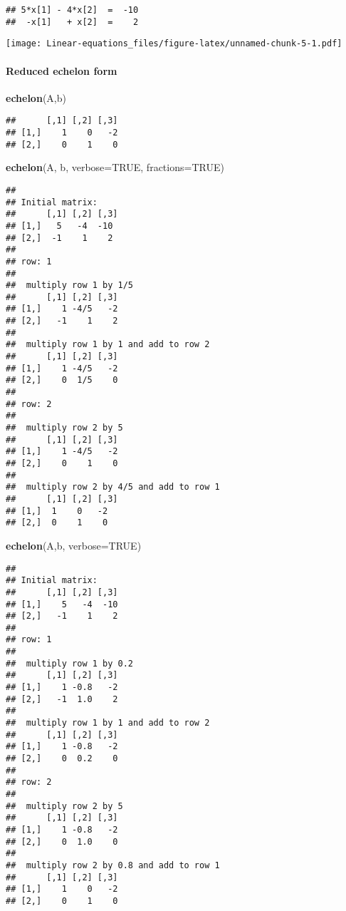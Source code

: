 \documentclass[
]{article}
\newenvironment{Shaded}{\begin{snugshade}}{\end{snugshade}}
\newcommand{\DataTypeTok}[1]{\textcolor[rgb]{0.13,0.29,0.53}{#1}}
\newcommand{\KeywordTok}[1]{\textcolor[rgb]{0.13,0.29,0.53}{\textbf{#1}}}
\newcommand{\NormalTok}[1]{#1}
\newcommand{\OtherTok}[1]{\textcolor[rgb]{0.56,0.35,0.01}{#1}}
\begin{document}
\begin{verbatim}
## 5*x[1] - 4*x[2]  =  -10 
##  -x[1]   + x[2]  =    2
\end{verbatim}

\texttt{[image: Linear-equations\_files/figure-latex/unnamed-chunk-5-1.pdf]}

\hypertarget{reduced-echelon-form}{%
\paragraph{Reduced echelon form}\label{reduced-echelon-form}}

\begin{Shaded}
\begin{Highlighting}[]
\KeywordTok{echelon}\NormalTok{(A,b)}
\end{Highlighting}
\end{Shaded}

\begin{verbatim}
##      [,1] [,2] [,3]
## [1,]    1    0   -2
## [2,]    0    1    0
\end{verbatim}

\begin{Shaded}
\begin{Highlighting}[]
\KeywordTok{echelon}\NormalTok{(A, b, }\DataTypeTok{verbose=}\OtherTok{TRUE}\NormalTok{, }\DataTypeTok{fractions=}\OtherTok{TRUE}\NormalTok{)}
\end{Highlighting}
\end{Shaded}

\begin{verbatim}
## 
## Initial matrix:
##      [,1] [,2] [,3]
## [1,]   5   -4  -10 
## [2,]  -1    1    2 
## 
## row: 1 
## 
##  multiply row 1 by 1/5 
##      [,1] [,2] [,3]
## [1,]    1 -4/5   -2
## [2,]   -1    1    2
## 
##  multiply row 1 by 1 and add to row 2 
##      [,1] [,2] [,3]
## [1,]    1 -4/5   -2
## [2,]    0  1/5    0
## 
## row: 2 
## 
##  multiply row 2 by 5 
##      [,1] [,2] [,3]
## [1,]    1 -4/5   -2
## [2,]    0    1    0
## 
##  multiply row 2 by 4/5 and add to row 1 
##      [,1] [,2] [,3]
## [1,]  1    0   -2  
## [2,]  0    1    0
\end{verbatim}

\begin{Shaded}
\begin{Highlighting}[]
\KeywordTok{echelon}\NormalTok{(A,b, }\DataTypeTok{verbose=}\OtherTok{TRUE}\NormalTok{)}
\end{Highlighting}
\end{Shaded}

\begin{verbatim}
## 
## Initial matrix:
##      [,1] [,2] [,3]
## [1,]    5   -4  -10
## [2,]   -1    1    2
## 
## row: 1 
## 
##  multiply row 1 by 0.2 
##      [,1] [,2] [,3]
## [1,]    1 -0.8   -2
## [2,]   -1  1.0    2
## 
##  multiply row 1 by 1 and add to row 2 
##      [,1] [,2] [,3]
## [1,]    1 -0.8   -2
## [2,]    0  0.2    0
## 
## row: 2 
## 
##  multiply row 2 by 5 
##      [,1] [,2] [,3]
## [1,]    1 -0.8   -2
## [2,]    0  1.0    0
## 
##  multiply row 2 by 0.8 and add to row 1 
##      [,1] [,2] [,3]
## [1,]    1    0   -2
## [2,]    0    1    0
\end{verbatim}
\end{document}
